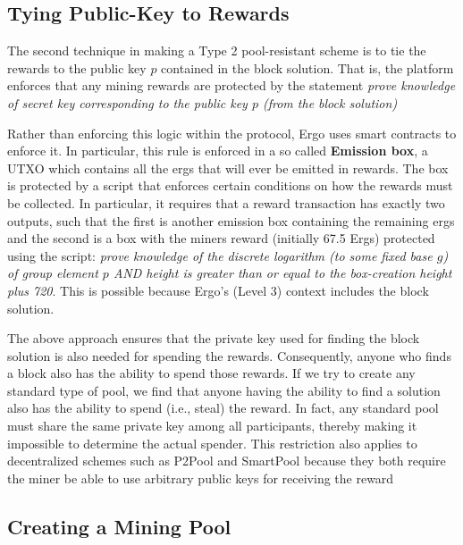 \documentclass[11pt]{article}
\begin{document}

\subsection{Tying Public-Key to Rewards}

The second technique in making a Type 2 pool-resistant scheme is to tie the rewards to the public key $p$ contained in the block solution. That is, the platform enforces that any mining rewards are protected by the statement {\em prove knowledge of secret key corresponding to the public key $p$ (from the block solution)}

Rather than enforcing this logic within the protocol, Ergo uses smart contracts to enforce it. In particular, this rule is enforced in a so called \textbf{Emission box}, a UTXO which contains all the ergs that will ever be emitted in rewards. The box is protected by a script that enforces certain conditions on how the rewards must be collected. In particular, it requires that a reward transaction has exactly two outputs, such that the first is another emission box containing the remaining ergs and the second is a box with the miners reward (initially 67.5 Ergs) protected using the script: {\em prove knowledge of the discrete logarithm (to some fixed base $g$) of group element $p$ AND height is greater than or equal to the box-creation height plus 720}.  
This is possible because Ergo's (Level 3) context includes the block solution.  

The above approach ensures that the private key used for finding the block solution is also needed for spending the rewards. Consequently, anyone who finds a block also has the ability to spend those rewards. 
If we try to create any standard type of pool, we find that anyone having the ability to find a solution also has the ability to spend (i.e., steal) the reward. In fact, any standard pool must share the same private key among all participants, thereby making it impossible to determine the actual spender. This restriction also applies to decentralized schemes such as P2Pool and SmartPool because they both require the miner be able to use arbitrary public keys for receiving the reward

\subsection{Creating a Mining Pool}
\end{document}

